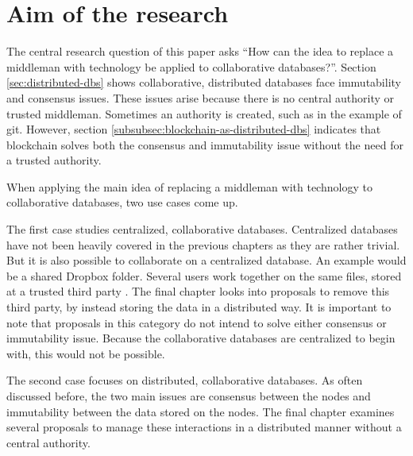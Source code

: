 \chapter{Aim of the research}

\iffalse
- start with consensus and consistency in col. distr. dbs => because no central authority
- pivot into main idea: have technology replace an indispensable middleman. As discussed in \ref{subsec:examples-distributed-dbs}, blockchains solve both issues very well. 
- to apply the main idea to collaborative databases: two approaches. First a centralized collaborative database can be stored without a middleman. Second, the interaction between a nodes of a distributed collaborative database can be managed without a middleman
- For the first approach, the final chapter looks into proposals to store data in a distributed manner. Every proposal is examined on advantages, disadvantages, viability and current implementations.
- Concerning the second approach, the last chapter focuses on proposals to manage the interaction 
\fi

The central research question of this paper asks ``How can the idea to replace a middleman with technology be applied to collaborative databases?''. Section \ref{sec:distributed-dbs} shows collaborative, distributed databases face immutability and consensus issues. These issues arise because there is no central authority or trusted middleman. Sometimes an authority is created, such as in the example of git. However, section \ref{subsubsec:blockchain-as-distributed-dbs} indicates that blockchain solves both the consensus and immutability issue without the need for a trusted authority.

When applying the main idea of replacing a middleman with technology to collaborative databases, two use cases come up.

The first case studies centralized, collaborative databases. Centralized databases have not been heavily covered in the previous chapters as they are rather trivial. But it is also possible to collaborate on a centralized database. An example would be a shared Dropbox folder. Several users work together on the same files, stored at a trusted third party \cite{dropbox-sharing}. The final chapter looks into proposals to remove this third party, by instead storing the data in a distributed way. It is important to note that proposals in this category do not intend to solve either consensus or immutability issue. Because the collaborative databases are centralized to begin with, this would not be possible.

The second case focuses on distributed, collaborative databases. As often discussed before, the two main issues are consensus between the nodes and immutability between the data stored on the nodes. The final chapter examines several proposals to manage these interactions in a distributed manner without a central authority.


